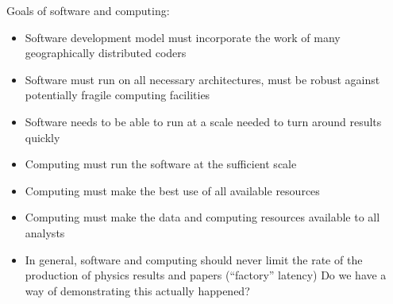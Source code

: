 Goals of software and computing:

\begin{itemize}
\item Software development model must incorporate the work of many geographically distributed coders
\item Software must run on all necessary architectures, must be robust against potentially fragile computing facilities
\item Software needs to be able to run at a scale needed to turn around results quickly
\item Computing must run the software at the sufficient scale
\item Computing must make the best use of all available resources
\item Computing must make the data and computing resources available to all analysts
\item In general, software and computing should never limit the rate of the production of physics results and papers (``factory'' latency) Do we have a way of demonstrating this actually happened?
\end{itemize}


